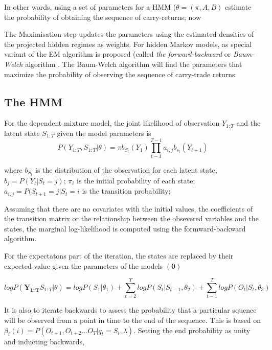 \documentclass[12pt, a4paper, oneside]{article} %
\begin{document}
In other words, using a set of parameters for a HMM ($\theta = (\pi, A, B)$ estimate the probability of obtaining the sequence of carry-returns; now 


The Maximisation step updates the parameters using the estimated densities of the projected hidden regimes as weights. For hidden Markov models, as special variant of the EM algorithm is proposed (called \emph{the forward-backward} or \emph{Baum-Welch} algorithm \citet{Baum1970}.   The Baum-Welch algorithm will find the parameters that maximize the probability of observing the sequence of carry-trade returns.  


\subsection{The HMM}
For the dependent mixture model, the joint likelihood of observation $Y_{1:T}$ and the latent state $S_{1:T}$ given the model parameters is 
\begin{equation}
P(Y_{1:T}, S_{1:T}|\theta) = \pi b_{S_t}(Y_1)\prod_{t-1}^{T-1} a_{i,j}b_{s_t}(Y_{t+1})
\end{equation}

where $b_{S_t}$ is the distribution of the observation for each latent state, $b_j = P(Y_t|S_t = j)$; $\pi_i$ is the initial probability of each state; $a_{i,j} = P(S_{t+1} = j| S_t = i$ is the transition probability;  

Assuming that there are no covariates with the initial values, the coefficients of the transition matrix or the relationship between the obsevered variables and the states, the marginal log-likelihood is computed using the formward-backward algorithm.

For the expectatons part of the iteration, the states are replaced by their expected value given the parameters of the models $(\mathbf{\theta})$

\begin{equation} 
log P(\mathbf{Y_{1:T}}S_{1:T}| \theta) = log P(S_1|\theta_1) + \sum_{t=2}^T log P(S_t|S_{t-1}, \theta_2) + \sum_{t-1}^T log P(O_t|S_t, \theta_3)
\end{equation}

It is also to iterate backwards to assess the probability that a particular squence will be observed from a point in time to the end of the sequence.  This is based on $\beta_t(i) = P(O_{t+1}, O_{t+2}\dots O_T| q_t = S_i, \lambda)$. Setting the end probability as unity and inducting backwards, 
\end{document}
